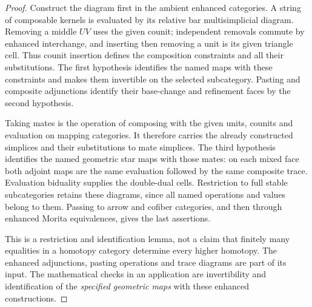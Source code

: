 \documentclass[11pt]{article}
\theoremstyle{definition}
\theoremstyle{remark}
\begin{document}
\begin{proof}
Construct the diagram first in the ambient enhanced categories.
A string of composable kernels is evaluated by its relative bar
multisimplicial diagram.  Removing a middle $UV$ uses the given
counit; independent removals commute by enhanced interchange, and
inserting then removing a unit is its given triangle cell.  Thus
counit insertion defines the composition constraints and all their
substitutions.  The first hypothesis identifies the named maps
with these constraints and makes them invertible on the selected
subcategory.  Pasting and composite adjunctions identify their
base-change and refinement faces by the second hypothesis.

Taking mates is the operation of composing with the given units,
counits and evaluation on mapping categories.  It therefore carries
the already constructed simplices and their substitutions to mate
simplices.  The third hypothesis identifies the named geometric
star maps with those mates: on each mixed face both adjoint maps
are the same evaluation followed by the same composite trace.
Evaluation biduality supplies the double-dual cells.  Restriction to
full stable subcategories retains these diagrams, since all named
operations and values belong to them.  Passing to arrow and cofiber
categories, and then through enhanced Morita equivalences, gives the
last assertions.

This is a restriction and identification lemma, not a claim that
finitely many equalities in a homotopy category determine every
higher homotopy.  The enhanced adjunctions, pasting operations and
trace diagrams are part of its input.  The mathematical checks in
an application are invertibility and identification of the
\emph{specified geometric maps} with these enhanced constructions.
\end{proof}
\end{document}
